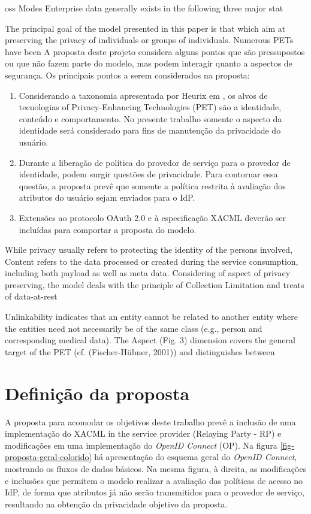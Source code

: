 \documentclass{doublecol-new}
\begin{document}
oss Modes
Enterprise data generally exists in 
the following three major stat

The principal goal of the model presented in this paper is that which aim
at preserving the privacy of individuals or groups of individuals. Numerous PETs have been
A proposta deste projeto considera alguns pontos que são pressupostos ou que não fazem parte do modelo, mas podem interagir quanto a aspectos de segurança. Os principais pontos a serem considerados na proposta:
\begin{enumerate}
	\item Considerando a taxonomia apresentada por Heurix em \cite{heurix2015taxonomy}, os alvos de tecnologias of Privacy-Enhancing Technologies (PET) são a identidade, conteúdo e comportamento. No presente trabalho somente o aspecto da identidade será considerado para fins de manutenção da privacidade do usuário.
	\item Durante a liberação de política do provedor de serviço para o provedor de identidade, podem surgir questões de privacidade. Para contornar essa questão, a proposta prevê que somente a política restrita à avaliação dos atributos do usuário sejam enviados para o IdP.
	\item Extensões ao protocolo OAuth 2.0 e à especificação XACML deverão ser incluídas para comportar a proposta do modelo.
\end{enumerate}

While privacy usually refers to protecting the identity of the persons involved, Content refers to the data processed or created during the service consumption, including both payload as well as meta data. \citep{heurix2015taxonomy}
Considering of aspect of privacy preserving, the model deals with the principle of Collection Limitation \citep{oecd2013guidelinesupdated} and treats of data-at-rest \citep{liu2010data}

Unlinkability indicates that an entity cannot be related to
another entity where the entities need not necessarily be of
the same class (e.g., person and corresponding medical data).
The Aspect (Fig. 3) dimension covers the general target of the
PET (cf. (Fischer-Hübner, 2001)) and distinguishes between




\section{Definição da proposta}

A proposta para acomodar os objetivos deste trabalho prevê a inclusão de uma implementação do XACML in the service provider (Relaying Party - RP) e modificações em uma implementação do \textit{OpenID Connect} (OP). Na figura \ref{fig-proposta-geral-colorido} há apresentação do esquema geral do \textit{OpenID Connect}, mostrando os fluxos de dados básicos. Na mesma figura, à direita, as modificações e inclusões que permitem o modelo realizar a avaliação das políticas de acesso no IdP, de forma que atributos já não serão transmitidos para o provedor de serviço, resultando na obtenção da privacidade objetivo da proposta. 
\end{document}
